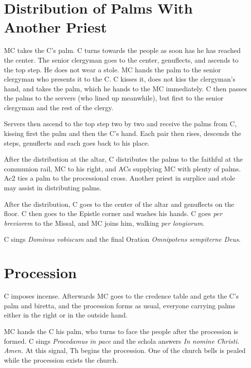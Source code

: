 {	\section{Distribution of Palms With Another Priest}

	\rubric MC takes the C's palm. C turns towards the people as soon has he
	has reached the center. The senior clergyman goes to the center,
	genuflects, and ascends to the top step. He does not wear a stole. MC hands
	the palm to the senior clergyman who presents it to the C. C kisses it,
	does not kiss the clergyman's hand, and takes the palm, which he hands to
	the MC immediately. C then passes the palms to the servers (who lined up
	meanwhile), but first to the senior clergyman and the rest of the clergy.

	\rubric Servers then ascend to the top step two by two and receive the
	palms from C, kissing first the palm and then the C's hand. Each pair then
	rises, descends the steps, genuflects and each goes back to his place.

	\rubric After the distribution at the altar, C distributes the palms to the
	faithful at the communion rail, MC to his right, and ACs supplying MC with
	plenty of palms. Ac2 ties a palm to the processional cross. Another priest
	in surplice and stole may assist in distributing palms.

	\rubric After the distribution, C goes to the center of the altar and
	genuflects on the floor. C then goes to the Epistle corner and washes his
	hands. C goes \textit{per breviorem} to the Missal, and MC joins him,
	walking \textit{per longiorum}.

	\rubric C sings \textit{Dominus vobiscum} and the final Oration
	\textit{Omnipotens sempiterne Deus}.

	\section{Procession}

	\rubric C imposes incense. Afterwards MC goes to the credence table and
	gets the C's palm and biretta, and the procession forms as usual, everyone
	carrying palms either in the right or in the outside hand.

    \rubric MC hands the C his palm, who turns to face the people after the
    procession is formed. C sings \textit{Procedamus in pace} and the schola
    answers \textit{In nomine Christi. Amen.} At this signal, Th begins the
    procession. One of the church bells is pealed while the procession exists
    the church.

}
